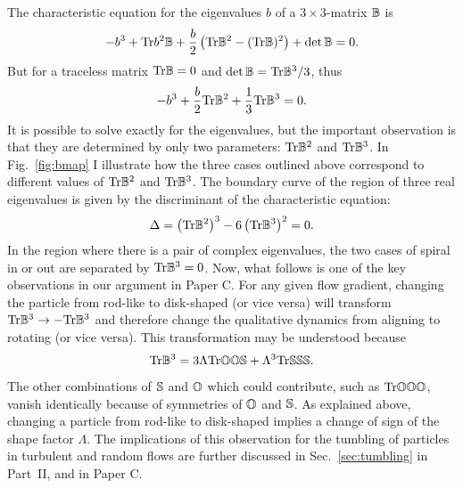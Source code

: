 \documentclass[thesis.tex]{subfiles}
\begin{document}
The characteristic equation for the eigenvalues $b$ of a $3\times3$-matrix $\mathbb{B}$ is
\begin{align*}
	-b^3 + \mbox{Tr} b^2\mathbb{B}  + \frac{b}{2}\left(\mbox{Tr} \mathbb{B}^2-(\mbox{Tr} \mathbb{B})^2\right)+\det\mathbb{B} = 0.
\end{align*}
But for a traceless matrix $\mbox{Tr} \mathbb{B}=0$ and $\det \mathbb{B} = \mbox{Tr}\mathbb{B}^3/3$, thus
\begin{align}
	-b^3 + \frac{b}{2}\tr \ma B^2 +\frac{1}{3}\tr\ma B^3 = 0. \eqnlab{bcharacteristic}
\end{align}
It is possible to solve exactly for the eigenvalues, but the important observation is that they are determined by only two parameters: $\mbox{Tr} \mathbb{B}^2$ and $\mbox{Tr}\mathbb{B}^3$. In Fig.~\ref{fig:bmap} I illustrate how the three cases outlined above correspond to different values of $\mbox{Tr} \mathbb{B}^2$ and $\mbox{Tr}\mathbb{B}^3$. The boundary curve of the region of three real eigenvalues is given by the discriminant of the characteristic equation:
\begin{align*}
 	\Delta = \left(\mbox{Tr} \mathbb{B}^2\right)^3 - 6\left(\mbox{Tr} \mathbb{B}^3\right)^2 = 0.
 \end{align*} 
In the region where there is a pair of complex eigenvalues, the two cases of spiral in or out are separated by $\mbox{Tr} \mathbb{B}^3=0$. Now, what follows is one of the key observations in our argument in Paper C. For any given flow gradient, changing the particle from rod-like to disk-shaped (or vice versa) will transform $\mbox{Tr} \mathbb{B}^3\to-\mbox{Tr}\mathbb{B}^3$ and therefore change the qualitative dynamics from aligning to rotating (or vice versa). This transformation may be understood because
\begin{align*}
	\mbox{Tr} \mathbb{B}^3 = 3\Lambda \mbox{Tr} \mathbb{O}\mathbb{O} \mathbb{S} + \Lambda^3 \mbox{Tr} \mathbb{S}\mathbb{S} \mathbb{S}.
\end{align*}
The other combinations of $\mathbb{S}$ and $\mathbb{O}$ which could contribute, such as $\mbox{Tr} \mathbb{O}\mathbb{O} \mathbb{O}$, vanish identically because of symmetries of $\mathbb{O}$ and $\mathbb{S}$. As explained above, changing a particle from rod-like to disk-shaped implies a change of sign of the shape factor $\Lambda$. The implications of this observation for the tumbling of particles in turbulent and random flows are further discussed in Sec.~\ref{sec:tumbling} in Part~II, and in Paper C. 
\end{document}
